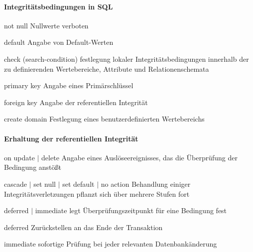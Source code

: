 \documentclass[a4paper]{article}
\begin{document}
\begin{multicols}{3}
    \paragraph{Integritätsbedingungen in SQL}
    \begin{description*}
        \item[not null] Nullwerte verboten
        \item[default] Angabe von Default-Werten
        \item[check] (search-condition) festlegung lokaler Integritätsbedingungen innerhalb der zu definierenden Wertebereiche, Attribute und Relationenschemata
        \item[primary key] Angabe eines Primärschlüssel
        \item[foreign key] Angabe der referentiellen Integrität
        \item[create domain] Festlegung eines benutzerdefinierten Wertebereichs
    \end{description*}

    \paragraph{Erhaltung der referentiellen Integrität}
    \begin{description*}
        \item[on update $\mid$ delete] Angabe eines Auslöseereignisses, das die Überprüfung der Bedingung anstößt
        \item[cascade $\mid$ set null $\mid$ set default $\mid$ no action] Behandlung einiger Integritätsverletzungen pflanzt sich über mehrere Stufen fort
        \item[deferred $\mid$ immediate] legt Überprüfungszeitpunkt für eine Bedingung fest
        \item[deferred] Zurückstellen an das Ende der Transaktion
        \item[immediate] sofortige Prüfung bei jeder relevanten Datenbankänderung
    \end{description*}


\end{multicols}
\end{document}
